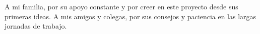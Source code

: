 \begin{dedication}

A mi familia, por su apoyo constante y por creer en este proyecto desde sus primeras ideas. A mis amigos y colegas, por sus consejos y paciencia en las largas jornadas de trabajo.

\end{dedication}
